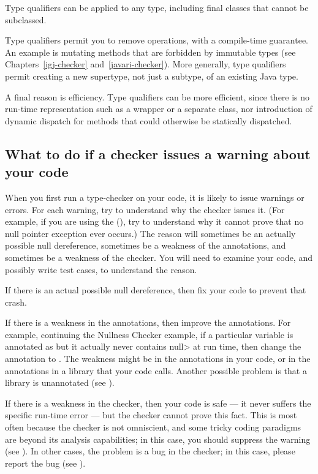 Type qualifiers can be applied to any type, including final classes that
cannot be subclassed.

Type qualifiers permit you to remove operations, with a compile-time
guarantee.  An example is mutating methods that are forbidden by immutable
types (see Chapters~\ref{igj-checker} and~\ref{javari-checker}).  More
generally, type qualifiers permit creating a new supertype, not just a
subtype, of an existing Java type.

A final reason is efficiency.  Type qualifiers can be more
efficient, since there is no run-time representation such as a wrapper
or a separate class, nor introduction of dynamic dispatch for methods that
could otherwise be statically dispatched.


\subsection{What to do if a checker issues a warning about your code\label{handling-warnings}}

When you first run a type-checker on your code, it is likely to issue
warnings or errors.  For each warning, try to understand why the checker
issues it.  (For example, if you are using the
(), try to understand why it cannot prove
that no null pointer exception ever occurs.)  The reason will sometimes be
an actually possible null dereference, sometimes be a weakness of the
annotations, and sometimes be a weakness of the checker.  You will need to
examine your code, and possibly write test cases, to understand the reason.

If there is an actual possible null dereference, then fix your code to
prevent that crash.

If there is a weakness in the annotations, then improve the annotations.
For example, continuing the Nullness Checker example, if a particular
variable is annotated as  but it
actually never contains \<null> at run time, then change the annotation to 
.  The weakness might be in the
annotations in your code, or in the annotations in a library that your code
calls.  Another possible problem is that a library is unannotated (see
).

If there is a weakness in the checker, then your code is safe --- it never
suffers the specific run-time error --- but the checker cannot prove this
fact.  This is most often because the checker is not omniscient, and some
tricky coding paradigms are beyond its analysis capabilities; in this
case, you should suppress the warning (see
).  In other cases, the problem is a
bug in the checker; in this case, please report the bug (see
).



